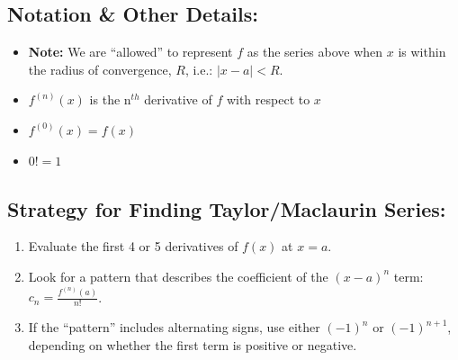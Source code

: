 \subsection*{ Notation \& Other Details:}
\begin{itemize}
\item \textbf{Note:} We are ``allowed'' to represent \(f\) as the series above when \(x\) is within the radius of convergence, \(R\), i.e.: \(|x-a|<R\).
\item \(f^{(n)}(x)\) is the n\(^{th}\) derivative of \(f\) with respect to \(x\)
\item \(f^{(0)}(x) = f(x)\)
\item \(0! = 1\)
\end{itemize}
%  
  
  

\subsection*{Strategy for Finding Taylor/Maclaurin Series:}
\begin{enumerate}[(1)]
\item Evaluate the first 4 or 5 derivatives of \(f(x)\) at \(x=a\).
\item Look for a pattern that describes the coefficient of the \((x-a)^n\) term:
\(c_n=\frac{f^{(n)}(a)}{n!}\).
\item If the ``pattern'' includes alternating signs, use either \((-1)^n\) or \((-1)^{n+1}\), depending on whether the first term is positive or negative.
\end{enumerate}




